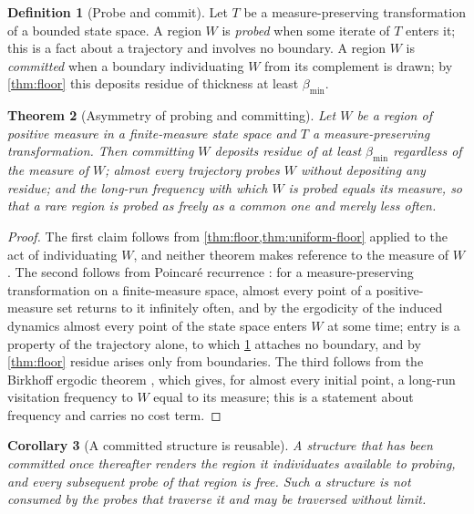 \documentclass[11pt,twocolumn,a4paper]{article}
\theoremstyle{plain}
\newtheorem{theorem}{Theorem}[section]
\newtheorem{corollary}[theorem]{Corollary}
\theoremstyle{definition}
\newtheorem{definition}[theorem]{Definition}
\theoremstyle{remark}
\newcommand{\thick}{\beta}
\newcommand{\floor}{\thick_{\min}}
\begin{document}
\begin{definition}[Probe and commit]
\label{def:probecommit}
Let $T$ be a measure-preserving transformation of a bounded state space. A
region $W$ is \emph{probed} when some iterate of $T$ enters it; this is a
fact about a trajectory and involves no boundary. A region $W$ is
\emph{committed} when a boundary individuating $W$ from its complement is
drawn; by \cref{thm:floor} this deposits residue of thickness at least
$\floor$.
\end{definition}

\begin{theorem}[Asymmetry of probing and committing]
\label{thm:asymmetry}
Let $W$ be a region of positive measure in a finite-measure state space and
$T$ a measure-preserving transformation. Then committing $W$ deposits
residue of at least $\floor$ regardless of the measure of $W$; almost every
trajectory probes $W$ without depositing any residue; and the long-run
frequency with which $W$ is probed equals its measure, so that a rare
region is probed as freely as a common one and merely less often.
\end{theorem}

\begin{proof}
The first claim follows from \cref{thm:floor,thm:uniform-floor} applied to
the act of individuating $W$, and neither theorem makes reference to the
measure of $W$. The second follows from Poincar\'{e} recurrence
\citep{poincare1890}: for a measure-preserving transformation on a
finite-measure space, almost every point of a positive-measure set returns
to it infinitely often, and by the ergodicity of the induced dynamics
almost every point of the state space enters $W$ at some time; entry is a
property of the trajectory alone, to which \cref{def:probecommit} attaches
no boundary, and by \cref{thm:floor} residue arises only from boundaries.
The third follows from the Birkhoff ergodic theorem
\citep{birkhoff1931}, which gives, for almost every initial point, a
long-run visitation frequency to $W$ equal to its measure; this is a
statement about frequency and carries no cost term.
\end{proof}

\begin{corollary}[A committed structure is reusable]
\label{cor:reuse}
A structure that has been committed once thereafter renders the region it
individuates available to probing, and every subsequent probe of that
region is free. Such a structure is not consumed by the probes that
traverse it and may be traversed without limit.
\end{corollary}
\end{document}
